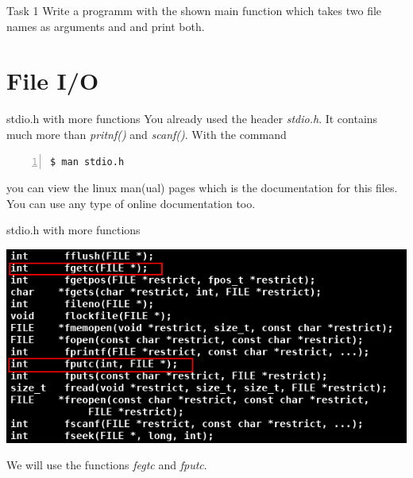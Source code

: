 
\begin{frame}{Task 1}
    Write a programm with the shown main function which takes two file names as arguments and 
    and print both.  
\end{frame}

\section{File I/O}

\begin{frame}[fragile]{stdio.h with more functions}
    You already used the header \textit{stdio.h}.
    It contains much more than \textit{pritnf()} and \textit{scanf()}.
    With the command
    \begin{lstlisting}[numbers=left]
    $ man stdio.h \end{lstlisting}    
    you can view the linux man(ual) pages which is the documentation for this files.
    \newline
    You can use any type of online documentation too.
\end{frame}


\begin{frame}[fragile]{stdio.h with more functions}
    \centerline{\includegraphics[scale=.7]{../img/man.png}}
    We will use the functions \textit{fegtc} and \textit{fputc}.
\end{frame}



